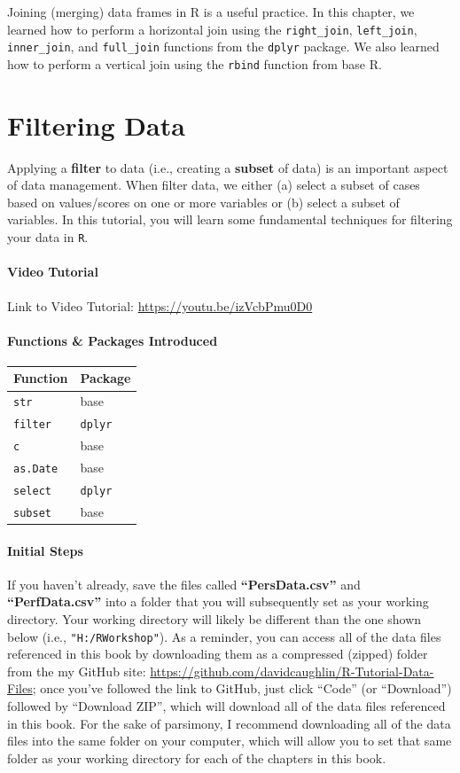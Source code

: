 \documentclass[]{book}
\begin{document}
Joining (merging) data frames in R is a useful practice. In this
chapter, we learned how to perform a horizontal join using the
\texttt{right\_join}, \texttt{left\_join}, \texttt{inner\_join}, and
\texttt{full\_join} functions from the \texttt{dplyr} package. We also
learned how to perform a vertical join using the \texttt{rbind} function
from base R.

\hypertarget{filter}{\chapter{Filtering Data}\label{filter}}

Applying a \textbf{filter} to data (i.e., creating a \textbf{subset} of
data) is an important aspect of data management. When filter data, we
either (a) select a subset of cases based on values/scores on one or
more variables or (b) select a subset of variables. In this tutorial,
you will learn some fundamental techniques for filtering your data in
\texttt{R}.

\subsubsection{Video Tutorial}\label{video-tutorial}

Link to Video Tutorial: \url{https://youtu.be/izVcbPmu0D0}

\subsubsection{Functions \& Packages
Introduced}\label{functions-packages-introduced}

\begin{longtable}[]{@{}ll@{}}
\toprule
Function & Package\tabularnewline
\midrule
\endhead
\texttt{str} & base\tabularnewline
\texttt{filter} & \texttt{dplyr}\tabularnewline
\texttt{c} & base\tabularnewline
\texttt{as.Date} & base\tabularnewline
\texttt{select} & \texttt{dplyr}\tabularnewline
\texttt{subset} & base\tabularnewline
\bottomrule
\end{longtable}

\subsubsection{Initial Steps}\label{initsteps_filter}

If you haven't already, save the files called \textbf{``PersData.csv''}
and \textbf{``PerfData.csv''} into a folder that you will subsequently
set as your working directory. Your working directory will likely be
different than the one shown below (i.e., \texttt{"H:/RWorkshop"}). As a
reminder, you can access all of the data files referenced in this book
by downloading them as a compressed (zipped) folder from the my GitHub
site: \url{https://github.com/davidcaughlin/R-Tutorial-Data-Files}; once
you've followed the link to GitHub, just click ``Code'' (or
``Download'') followed by ``Download ZIP'', which will download all of
the data files referenced in this book. For the sake of parsimony, I
recommend downloading all of the data files into the same folder on your
computer, which will allow you to set that same folder as your working
directory for each of the chapters in this book.
\end{document}
